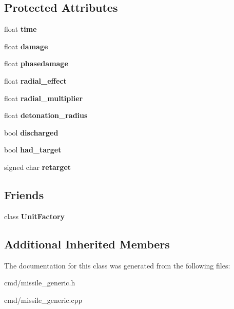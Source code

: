 \subsection*{Protected Attributes}
\begin{DoxyCompactItemize}
\item 
float {\bfseries time}\hypertarget{classMissile_a59f31a10ac802d7d23988923c88cde91}{}\label{classMissile_a59f31a10ac802d7d23988923c88cde91}

\item 
float {\bfseries damage}\hypertarget{classMissile_ad9476062fa33135b2f03562db4bfa365}{}\label{classMissile_ad9476062fa33135b2f03562db4bfa365}

\item 
float {\bfseries phasedamage}\hypertarget{classMissile_ae250b31575ba72c7b6cc75fb79f8c7b3}{}\label{classMissile_ae250b31575ba72c7b6cc75fb79f8c7b3}

\item 
float {\bfseries radial\+\_\+effect}\hypertarget{classMissile_ab114576ad448b1e9ef8ba30a7b632887}{}\label{classMissile_ab114576ad448b1e9ef8ba30a7b632887}

\item 
float {\bfseries radial\+\_\+multiplier}\hypertarget{classMissile_af359a2637e2a3a5400664deea00cb668}{}\label{classMissile_af359a2637e2a3a5400664deea00cb668}

\item 
float {\bfseries detonation\+\_\+radius}\hypertarget{classMissile_a7939a3b1c707f22ef9373f08d7e8f5ad}{}\label{classMissile_a7939a3b1c707f22ef9373f08d7e8f5ad}

\item 
bool {\bfseries discharged}\hypertarget{classMissile_ac31c22b38b0891b7b3351e9d44573250}{}\label{classMissile_ac31c22b38b0891b7b3351e9d44573250}

\item 
bool {\bfseries had\+\_\+target}\hypertarget{classMissile_ab3a80f00f724c6697a287e255f224c57}{}\label{classMissile_ab3a80f00f724c6697a287e255f224c57}

\item 
signed char {\bfseries retarget}\hypertarget{classMissile_af4398b0dd1be7baad7a9ef58eb2968a9}{}\label{classMissile_af4398b0dd1be7baad7a9ef58eb2968a9}

\end{DoxyCompactItemize}
\subsection*{Friends}
\begin{DoxyCompactItemize}
\item 
class {\bfseries Unit\+Factory}\hypertarget{classMissile_a187c66d2d867f6265d3b0c99ffc34838}{}\label{classMissile_a187c66d2d867f6265d3b0c99ffc34838}

\end{DoxyCompactItemize}
\subsection*{Additional Inherited Members}


The documentation for this class was generated from the following files\+:\begin{DoxyCompactItemize}
\item 
cmd/missile\+\_\+generic.\+h\item 
cmd/missile\+\_\+generic.\+cpp\end{DoxyCompactItemize}
